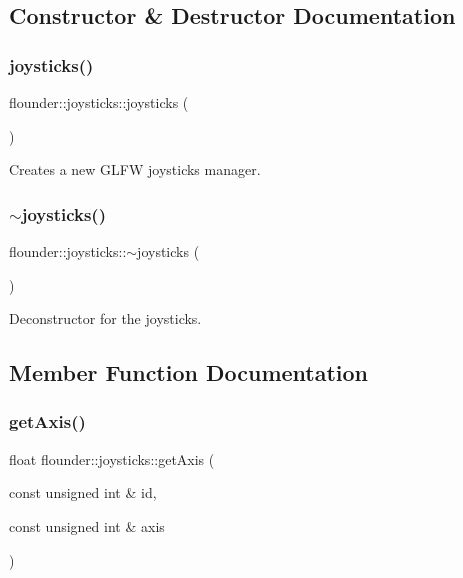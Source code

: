 \subsection{Constructor \& Destructor Documentation}
\mbox{\label{classflounder_1_1joysticks_ad0676c90afa28b4fb69de64c253e9c34}} 
\subsubsection{\texorpdfstring{joysticks()}{joysticks()}}
{\footnotesize\ttfamily flounder\+::joysticks\+::joysticks (\begin{DoxyParamCaption}{ }\end{DoxyParamCaption})}



Creates a new G\+L\+FW joysticks manager. 

\mbox{\label{classflounder_1_1joysticks_aaab9cf61c7c5d6736742347c7c657ed8}} 
\subsubsection{\texorpdfstring{$\sim$joysticks()}{~joysticks()}}
{\footnotesize\ttfamily flounder\+::joysticks\+::$\sim$joysticks (\begin{DoxyParamCaption}{ }\end{DoxyParamCaption})}



Deconstructor for the joysticks. 



\subsection{Member Function Documentation}
\mbox{\label{classflounder_1_1joysticks_a992bbe1f8a516d685a0e00867bdb6929}} 
\subsubsection{\texorpdfstring{get\+Axis()}{getAxis()}}
{\footnotesize\ttfamily float flounder\+::joysticks\+::get\+Axis (\begin{DoxyParamCaption}\item[{const unsigned int \&}]{id,  }\item[{const unsigned int \&}]{axis }\end{DoxyParamCaption})}



